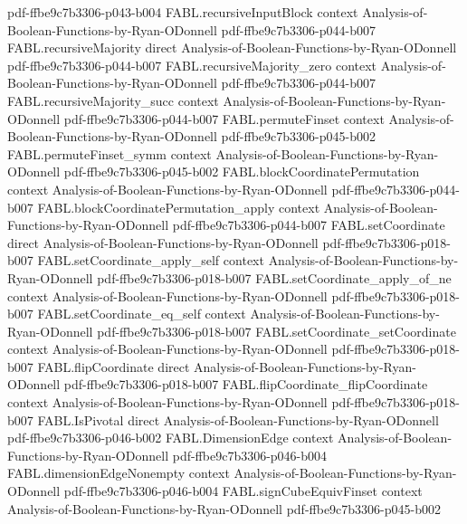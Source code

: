 \begin{theorem}
  {pdf-ffbe9c7b3306-p043-b004}
\proofstep
  {FABL.recursiveInputBlock}
  {context}
  {Analysis-of-Boolean-Functions-by-Ryan-ODonnell}
  {pdf-ffbe9c7b3306-p044-b007}
\proofstep
  {FABL.recursiveMajority}
  {direct}
  {Analysis-of-Boolean-Functions-by-Ryan-ODonnell}
  {pdf-ffbe9c7b3306-p044-b007}
\proofstep
  {FABL.recursiveMajority_zero}
  {context}
  {Analysis-of-Boolean-Functions-by-Ryan-ODonnell}
  {pdf-ffbe9c7b3306-p044-b007}
\proofstep
  {FABL.recursiveMajority_succ}
  {context}
  {Analysis-of-Boolean-Functions-by-Ryan-ODonnell}
  {pdf-ffbe9c7b3306-p044-b007}
\proofstep
  {FABL.permuteFinset}
  {context}
  {Analysis-of-Boolean-Functions-by-Ryan-ODonnell}
  {pdf-ffbe9c7b3306-p045-b002}
\proofstep
  {FABL.permuteFinset_symm}
  {context}
  {Analysis-of-Boolean-Functions-by-Ryan-ODonnell}
  {pdf-ffbe9c7b3306-p045-b002}
\proofstep
  {FABL.blockCoordinatePermutation}
  {context}
  {Analysis-of-Boolean-Functions-by-Ryan-ODonnell}
  {pdf-ffbe9c7b3306-p044-b007}
\proofstep
  {FABL.blockCoordinatePermutation_apply}
  {context}
  {Analysis-of-Boolean-Functions-by-Ryan-ODonnell}
  {pdf-ffbe9c7b3306-p044-b007}
\proofstep
  {FABL.setCoordinate}
  {direct}
  {Analysis-of-Boolean-Functions-by-Ryan-ODonnell}
  {pdf-ffbe9c7b3306-p018-b007}
\proofstep
  {FABL.setCoordinate_apply_self}
  {context}
  {Analysis-of-Boolean-Functions-by-Ryan-ODonnell}
  {pdf-ffbe9c7b3306-p018-b007}
\proofstep
  {FABL.setCoordinate_apply_of_ne}
  {context}
  {Analysis-of-Boolean-Functions-by-Ryan-ODonnell}
  {pdf-ffbe9c7b3306-p018-b007}
\proofstep
  {FABL.setCoordinate_eq_self}
  {context}
  {Analysis-of-Boolean-Functions-by-Ryan-ODonnell}
  {pdf-ffbe9c7b3306-p018-b007}
\proofstep
  {FABL.setCoordinate_setCoordinate}
  {context}
  {Analysis-of-Boolean-Functions-by-Ryan-ODonnell}
  {pdf-ffbe9c7b3306-p018-b007}
\proofstep
  {FABL.flipCoordinate}
  {direct}
  {Analysis-of-Boolean-Functions-by-Ryan-ODonnell}
  {pdf-ffbe9c7b3306-p018-b007}
\proofstep
  {FABL.flipCoordinate_flipCoordinate}
  {context}
  {Analysis-of-Boolean-Functions-by-Ryan-ODonnell}
  {pdf-ffbe9c7b3306-p018-b007}
\proofstep
  {FABL.IsPivotal}
  {direct}
  {Analysis-of-Boolean-Functions-by-Ryan-ODonnell}
  {pdf-ffbe9c7b3306-p046-b002}
\proofstep
  {FABL.DimensionEdge}
  {context}
  {Analysis-of-Boolean-Functions-by-Ryan-ODonnell}
  {pdf-ffbe9c7b3306-p046-b004}
\proofstep
  {FABL.dimensionEdgeNonempty}
  {context}
  {Analysis-of-Boolean-Functions-by-Ryan-ODonnell}
  {pdf-ffbe9c7b3306-p046-b004}
\proofstep
  {FABL.signCubeEquivFinset}
  {context}
  {Analysis-of-Boolean-Functions-by-Ryan-ODonnell}
  {pdf-ffbe9c7b3306-p045-b002}
\proofstep

\end{theorem}
